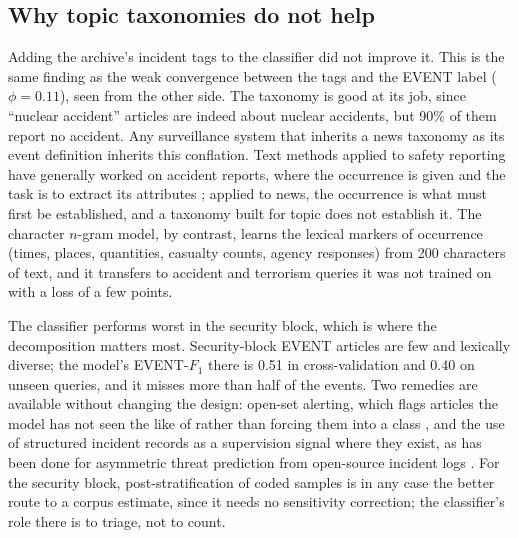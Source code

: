 \documentclass[1p,times]{elsarticle}
\begin{document}
\subsection{Why topic taxonomies do not help}
Adding the archive's incident tags to the classifier did not improve it. This is the same finding as the weak convergence between the tags and the EVENT label ($\phi = 0.11$), seen from the other side. The taxonomy is good at its job, since ``nuclear accident'' articles are indeed about nuclear accidents, but 90\% of them report no accident. Any surveillance system that inherits a news taxonomy as its event definition inherits this conflation. Text methods applied to safety reporting have generally worked on accident reports, where the occurrence is given and the task is to extract its attributes \cite{hughes2019extracting}; applied to news, the occurrence is what must first be established, and a taxonomy built for topic does not establish it. The character $n$-gram model, by contrast, learns the lexical markers of occurrence (times, places, quantities, casualty counts, agency responses) from 200 characters of text, and it transfers to accident and terrorism queries it was not trained on with a loss of a few points.

The classifier performs worst in the security block, which is where the decomposition matters most. Security-block EVENT articles are few and lexically diverse; the model's EVENT-$F_1$ there is 0.51 in cross-validation and 0.40 on unseen queries, and it misses more than half of the events. Two remedies are available without changing the design: open-set alerting, which flags articles the model has not seen the like of rather than forcing them into a class \cite{kang2026openset}, and the use of structured incident records as a supervision signal where they exist, as has been done for asymmetric threat prediction from open-source incident logs \cite{bae2025balloon}. For the security block, post-stratification of coded samples is in any case the better route to a corpus estimate, since it needs no sensitivity correction; the classifier's role there is to triage, not to count.
\end{document}
